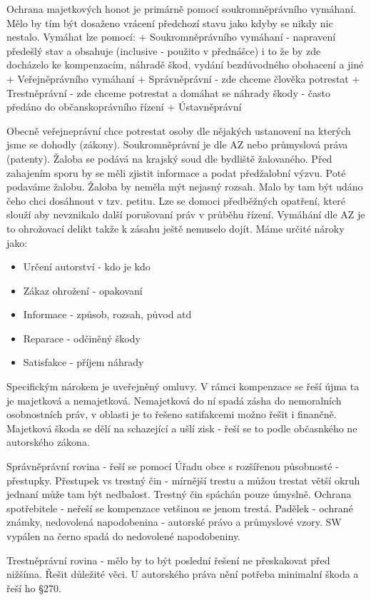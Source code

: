 \documentclass[12pt,a4paper,czech]{article}
\begin{document}
Ochrana majetkových honot je primárně pomocí soukromněprávního vymáhaní. Mělo by tím být dosaženo vrácení předchozí stavu jako kdyby se nikdy nic nestalo. 
Vymáhat lze pomocí:
+ Soukromněprávního vymáhaní - napravení předešlý stav a obsahuje (inclusive - použito v přednášce) i to že by zde docházelo ke kompenzacím, náhradě škod, vydání bezdůvodného obohacení a jiné
+ Veřejněprávního vymáhaní
  + Správněprávní - zde chceme člověka potrestat 
  + Trestněprávní - zde chceme potrestat a domáhat se náhrady škody - často předáno do občanskoprávního řízení
  + Ústavněprávní
  
Obecně veřejneprávní chce potrestat osoby dle nějakých ustanovení na kterých jsme se dohodly (zákony).
Soukromněprávní je dle AZ nebo průmyslová práva (patenty). Žaloba se podává na krajský soud dle bydliště žalovaného. Před zahajením sporu by se měli zjistit informace a podat předžalobní výzvu. Poté podaváme žalobu. Žaloba by neměla mýt nejasný rozsah. Malo by tam být udáno čeho chci dosáhnout v tzv. petitu. Lze se domoci předběžných opatření, které slouží aby nevznikalo další porušovaní práv v průběhu řízení. Vymáhání dle AZ je to ohrožovací delikt takže k zásahu ještě nemuselo dojít. Máme určité nároky jako:
\begin{itemize}
    \item  Určení autorství - kdo je kdo
    \item Zákaz ohrožení - opakovaní
    \item Informace - způsob, rozsah, původ atd
    \item Reparace - odčiněný škody
    \item Satisfakce - příjem náhrady
\end{itemize}
Specifickým nárokem je uveřejněný omluvy. V rámci kompenzace se řeší újma ta je majetková a nemajetková. Nemajetková do ní spadá zásha do nemoralních osobnostních práv, v oblasti je to řešeno satifakcemi možno řešit i finančně. Majetková škoda se dělí na schazející a ušlí zisk - řeší se to podle občasnkého ne autorského zákona.

Správněprávní rovina - řeší se pomocí Úřadu obce s rozšířenou působnosté - přestupky. Přestupek vs trestný čin - mírnější trestu a můžou trestat větší okruh jednaní může tam být nedbalost. Trestný čin spáchán pouze úmyslně. Ochrana spotřebitele - neřeší se kompenzace vetšinou se jenom trestá. Padělek - ochrané známky, nedovolená napodobenina - autorské právo a průmyslové vzory. SW vypálen na černo spadá do nedovolené napodobeniny.

Trestněprávní rovina - mělo by to být poslední řešení ne přeskakovat před nižšíma. Řešit důležité věci. U autorského práva nění potřeba minimalní škoda a řeší ho §270. 


\end{document}
